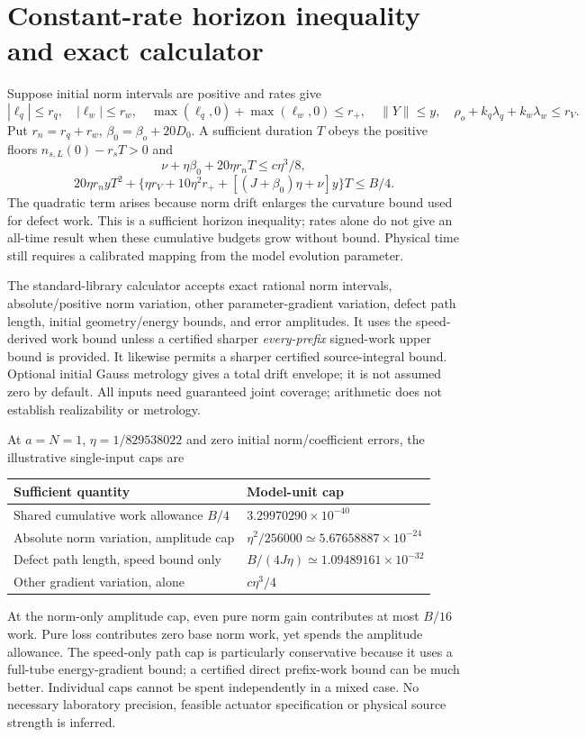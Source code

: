 \documentclass[11pt,a4paper]{article}
\begin{document}
\section{Constant-rate horizon inequality and exact calculator}
Suppose initial norm intervals are positive and rates give
\[
|\ell_q|\le r_q,\quad|\ell_w|\le r_w,\quad
\max(\ell_q,0)+\max(\ell_w,0)\le r_+,\quad
\|Y\|\le y,\quad \rho_o+k_q\lambda_q+k_w\lambda_w\le r_V.
\]
Put $r_n=r_q+r_w$, $\beta_0=\beta_o+20D_0$. A sufficient duration $T$ obeys the positive floors $n_{s,L}(0)-r_sT>0$ and
\[
\nu+\eta\beta_0+20\eta r_nT\le c\eta^3/8,
\]
\[
\boxed{20\eta r_n yT^2+
\{\eta r_V+10\eta^2r_++[(J+\beta_0)\eta+\nu]y\}T\le B/4.}
\]
The quadratic term arises because norm drift enlarges the curvature bound used for defect work. This is a sufficient horizon inequality; rates alone do not give an all-time result when these cumulative budgets grow without bound. Physical time still requires a calibrated mapping from the model evolution parameter.

The standard-library calculator accepts exact rational norm intervals, absolute/positive norm variation, other parameter-gradient variation, defect path length, initial geometry/energy bounds, and error amplitudes. It uses the speed-derived work bound unless a certified sharper \emph{every-prefix} signed-work upper bound is provided. It likewise permits a sharper certified source-integral bound. Optional initial Gauss metrology gives a total drift envelope; it is not assumed zero by default. All inputs need guaranteed joint coverage; arithmetic does not establish realizability or metrology.

At $a=N=1$, $\eta=1/829538022$ and zero initial norm/coefficient errors, the illustrative single-input caps are
\begin{center}
\begin{tabular}{ll}\toprule
Sufficient quantity & Model-unit cap\\\midrule
Shared cumulative work allowance $B/4$ & $3.29970290\times10^{-40}$\\
Absolute norm variation, amplitude cap & $\eta^2/256000\simeq5.67658887\times10^{-24}$\\
Defect path length, speed bound only & $B/(4J\eta)\simeq1.09489161\times10^{-32}$\\
Other gradient variation, alone & $c\eta^3/4$\\\bottomrule
\end{tabular}
\end{center}
At the norm-only amplitude cap, even pure norm gain contributes at most $B/16$ work. Pure loss contributes zero base norm work, yet spends the amplitude allowance. The speed-only path cap is particularly conservative because it uses a full-tube energy-gradient bound; a certified direct prefix-work bound can be much better. Individual caps cannot be spent independently in a mixed case. No necessary laboratory precision, feasible actuator specification or physical source strength is inferred.
\end{document}

